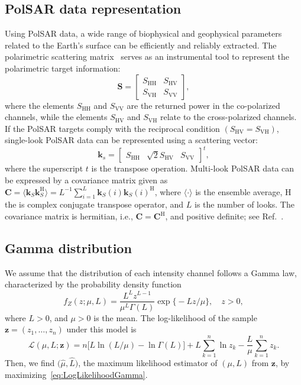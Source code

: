 \documentclass{article}
\begin{document}
\subsection{PolSAR data representation}
Using PolSAR data, a wide range of biophysical and geophysical parameters related to the Earth's surface can be efficiently and reliably extracted. The polarimetric scattering matrix~\cite{Lee2017} serves as an instrumental tool to represent the polarimetric target information:
\begin{equation}
 \mathbf{S} = \begin{bmatrix}
S_{\text{HH}} & S_{\text{HV}} \\
S_{\text{VH}} & S_{\text{VV}}
\end{bmatrix},  
\label{E:a1}
\end{equation}
where the elements $S_{\text{HH}}$ and $S_{\text{VV}}$ are the returned power in the co-polarized channels, while the elements $S_{\text{HV}}$ and $S_{\text{VH}}$ relate to the cross-polarized channels.
If the PolSAR targets comply with the reciprocal condition $(S_{\text{HV}} = S_{\text{VH}})$, single-look PolSAR data can be represented using a scattering vector:
\begin{equation}
\mathbf{k}_s=\begin{bmatrix}
S_{\text{HH}} & \sqrt{2}S_{\text{HV}} & S_{\text{VV}}
\end{bmatrix}^t,
\label{E:21}
\end{equation}
where  the superscript $t$ is the transpose operation. 
Multi-look PolSAR data can be expressed  by a covariance matrix  given as 
\(\mathbf{C}=\langle\mathbf{k}_S\mathbf{k}_S^\text{H} \rangle= {L}^{-1} \sum_{i=1}^{L} \mathbf{k}_S(i)\mathbf{k}_S(i)^\text{H} \), where $\langle \cdot \rangle$ is the ensemble average, $\text{H}$  the is complex conjugate transpose operator, and $L$ is the number of looks. 
The covariance matrix is hermitian, i.e., $\mathbf{C}= \mathbf{C}^\text{H}$, and positive definite;
see Ref.~\cite{Qin2022}.

\subsection{Gamma distribution}

We assume that the distribution of each intensity channel  follows a Gamma law, characterized by the probability density function
\begin{equation}
f_Z(z;\mu,L)=\frac{L^{L}z^{L-1}}{\mu^{L}\Gamma(L)} \exp\big\{-Lz/\mu\big\},\quad z>0,
\label{func_dens_uni_gamma}
\end{equation}
where $L>0$, and
$\mu>0$ is the mean.
The log-likelihood of the sample $\bm{z} = (z_1,\dots,z_n)$ under this model is
\begin{equation}
\mathcal{L}(\mu, L; \bm{z}) = 
n \big[L\ln (L / \mu) - \ln \Gamma(L)\big]
+L \sum_{k=1}^{n}\ln z_k -\frac{L}{\mu}\sum_{k=1}^{n} z_k.
\label{eq:LogLikelihoodGamma}
\end{equation}
Then, we find $\big(\widehat \mu, \widehat L\big)$, the maximum likelihood estimator of $(\mu, L)$ from $\bm{z}$, by maximizing~\eqref{eq:LogLikelihoodGamma}.
\end{document}
